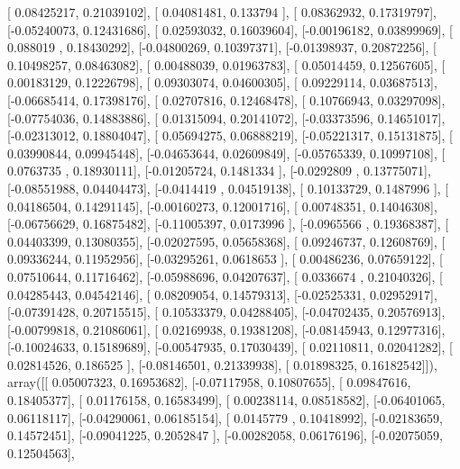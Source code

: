 \documentclass{article}
\begin{document}
       [ 0.08425217,  0.21039102],
       [ 0.04081481,  0.133794  ],
       [ 0.08362932,  0.17319797],
       [-0.05240073,  0.12431686],
       [ 0.02593032,  0.16039604],
       [-0.00196182,  0.03899969],
       [ 0.088019  ,  0.18430292],
       [-0.04800269,  0.10397371],
       [-0.01398937,  0.20872256],
       [ 0.10498257,  0.08463082],
       [ 0.00488039,  0.01963783],
       [ 0.05014459,  0.12567605],
       [ 0.00183129,  0.12226798],
       [ 0.09303074,  0.04600305],
       [ 0.09229114,  0.03687513],
       [-0.06685414,  0.17398176],
       [ 0.02707816,  0.12468478],
       [ 0.10766943,  0.03297098],
       [-0.07754036,  0.14883886],
       [ 0.01315094,  0.20141072],
       [-0.03373596,  0.14651017],
       [-0.02313012,  0.18804047],
       [ 0.05694275,  0.06888219],
       [-0.05221317,  0.15131875],
       [ 0.03990844,  0.09945448],
       [-0.04653644,  0.02609849],
       [-0.05765339,  0.10997108],
       [ 0.0763735 ,  0.18930111],
       [-0.01205724,  0.1481334 ],
       [-0.0292809 ,  0.13775071],
       [-0.08551988,  0.04404473],
       [-0.0414419 ,  0.04519138],
       [ 0.10133729,  0.1487996 ],
       [ 0.04186504,  0.14291145],
       [-0.00160273,  0.12001716],
       [ 0.00748351,  0.14046308],
       [-0.06756629,  0.16875482],
       [-0.11005397,  0.0173996 ],
       [-0.0965566 ,  0.19368387],
       [ 0.04403399,  0.13080355],
       [-0.02027595,  0.05658368],
       [ 0.09246737,  0.12608769],
       [ 0.09336244,  0.11952956],
       [-0.03295261,  0.0618653 ],
       [ 0.00486236,  0.07659122],
       [ 0.07510644,  0.11716462],
       [-0.05988696,  0.04207637],
       [ 0.0336674 ,  0.21040326],
       [ 0.04285443,  0.04542146],
       [ 0.08209054,  0.14579313],
       [-0.02525331,  0.02952917],
       [-0.07391428,  0.20715515],
       [ 0.10533379,  0.04288405],
       [-0.04702435,  0.20576913],
       [-0.00799818,  0.21086061],
       [ 0.02169938,  0.19381208],
       [-0.08145943,  0.12977316],
       [-0.10024633,  0.15189689],
       [-0.00547935,  0.17030439],
       [ 0.02110811,  0.02041282],
       [ 0.02814526,  0.186525  ],
       [-0.08146501,  0.21339938],
       [ 0.01898325,  0.16182542]]), array([[ 0.05007323,  0.16953682],
       [-0.07117958,  0.10807655],
       [ 0.09847616,  0.18405377],
       [ 0.01176158,  0.16583499],
       [ 0.00238114,  0.08518582],
       [-0.06401065,  0.06118117],
       [-0.04290061,  0.06185154],
       [ 0.0145779 ,  0.10418992],
       [-0.02183659,  0.14572451],
       [-0.09041225,  0.2052847 ],
       [-0.00282058,  0.06176196],
       [-0.02075059,  0.12504563],
\end{document}
